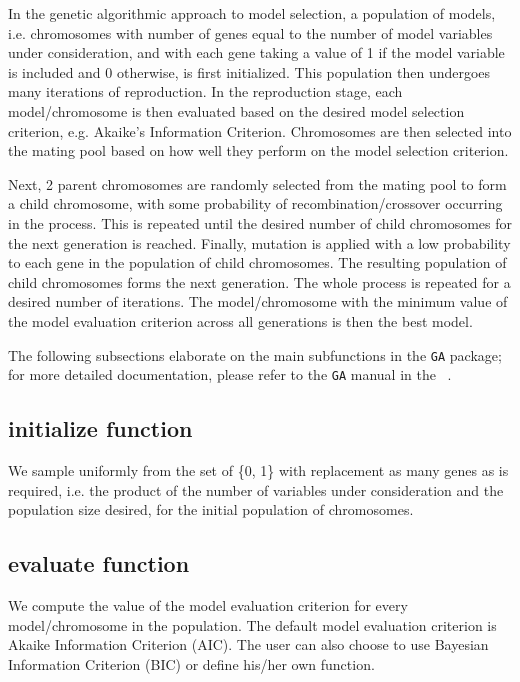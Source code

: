 \documentclass[11pt]{article}
\begin{document}
In the genetic algorithmic approach to model selection, a population of models, i.e. chromosomes with number of genes equal to the number of model variables under consideration, and with each gene taking a value of 1 if the model variable is included and 0 otherwise, is first initialized. This population then undergoes many iterations of reproduction. In the reproduction stage, each model/chromosome is then evaluated based on the desired model selection criterion, e.g. Akaike's Information Criterion. Chromosomes are then selected into the mating pool based on how well they perform on the model selection criterion. 

Next, 2 parent chromosomes are randomly selected from the mating pool to form a child chromosome, with some probability of recombination/crossover occurring in the process. This is repeated until the desired number of child chromosomes for the next generation is reached. Finally, mutation is applied with a low probability to each gene in the population of child chromosomes. The resulting population of child chromosomes forms the next generation. The whole process is repeated for a desired number of iterations. The model/chromosome with the minimum value of the model evaluation criterion across all generations is then the best model.

The following subsections elaborate on the main subfunctions in the \texttt{GA} package; for more detailed documentation, please refer to the \texttt{GA} manual in the ~.

\subsection*{initialize function}
We sample uniformly from the set of \{0, 1\} with replacement as many genes as is required, i.e. the product of the number of variables under consideration and the population size desired, for the initial population of chromosomes.

\subsection*{evaluate function}
We compute the value of the model evaluation criterion for every model/chromosome in the population. The default model evaluation criterion is Akaike Information Criterion (AIC). The user can also choose to use Bayesian Information Criterion (BIC) or define his/her own function.
\end{document}
